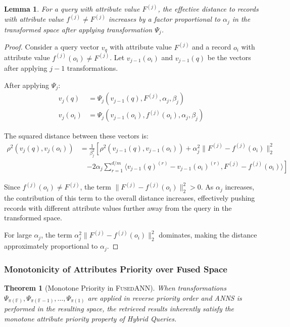 \documentclass[numbers,sort]{article}
\newtheorem{lemma}{Lemma}
\newtheorem{theorem}{Theorem}
\begin{document}
\begin{lemma}
\label{lemma:effective-distance}
For a query with attribute value $F^{(j)}$, the effective distance to records with attribute value $f^{(j)} \neq F^{(j)}$ increases by a factor proportional to $\alpha_j$ in the transformed space after applying transformation $\Psi_j$.
\end{lemma}

\begin{proof}
Consider a query vector $v_q$ with attribute value $F^{(j)}$ and a record $o_i$ with attribute value $f^{(j)}(o_i) \neq F^{(j)}$. Let $v_{j-1}(o_i)$ and $v_{j-1}(q)$ be the vectors after applying $j-1$ transformations.

After applying $\Psi_j$:
\begin{align}
v_j(q) &= \Psi_j(v_{j-1}(q), F^{(j)}, \alpha_j, \beta_j) \\
v_j(o_i) &= \Psi_j(v_{j-1}(o_i), f^{(j)}(o_i), \alpha_j, \beta_j)
\end{align}

The squared distance between these vectors is:
\begin{align}
\rho^2(v_j(q), v_j(o_i)) &= \frac{1}{\beta_j^2} \left[ \rho^2(v_{j-1}(q), v_{j-1}(o_i)) + \alpha_j^2 \|F^{(j)} - f^{(j)}(o_i)\|_2^2 \right. \\
&\quad \left. - 2\alpha_j \sum_{r=1}^{d/m} \langle v_{j-1}(q)^{(r)} - v_{j-1}(o_i)^{(r)}, F^{(j)} - f^{(j)}(o_i) \rangle \right]
\end{align}

Since $f^{(j)}(o_i) \neq F^{(j)}$, the term $\|F^{(j)} - f^{(j)}(o_i)\|_2^2 > 0$. As $\alpha_j$ increases, the contribution of this term to the overall distance increases, effectively pushing records with different attribute values further away from the query in the transformed space.

For large $\alpha_j$, the term $\alpha_j^2 \|F^{(j)} - f^{(j)}(o_i)\|_2^2$ dominates, making the distance approximately proportional to $\alpha_j$.
\end{proof}
\subsubsection{Monotonicity of Attributes Priority over Fused Space}
\begin{theorem}[Monotone Priority in \textsc{FusedANN}]
\label{thm:monotone-priority-fcvi}
When transformations $\Psi_{\pi(\mathbb{F})}, \Psi_{\pi(\mathbb{F}-1)}, \ldots, \Psi_{\pi(1)}$ are applied in reverse priority order and ANNS is performed in the resulting space, the retrieved results inherently satisfy the monotone attribute priority property of Hybrid Queries.
\end{theorem}
\end{document}
